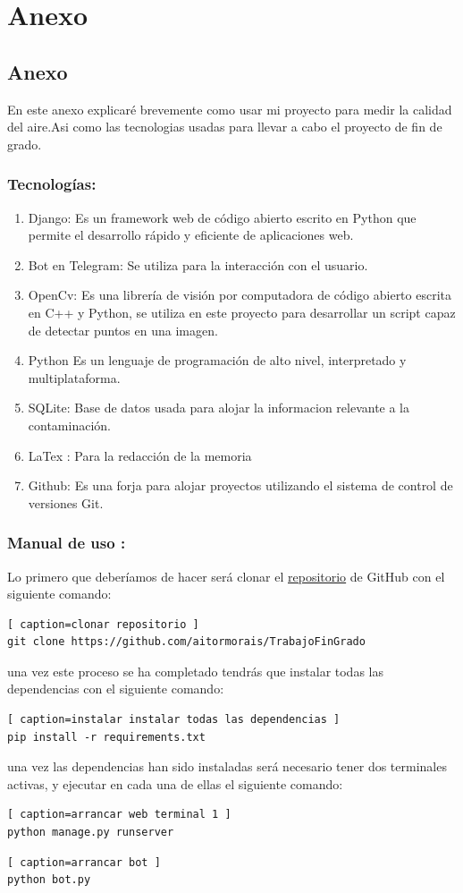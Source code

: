 \chapter{Anexo}\label{int}
\thispagestyle{fancy}


\section*{Anexo}
En este anexo explicaré brevemente como usar mi proyecto para medir la calidad del aire.Asi como las tecnologias usadas para llevar a cabo el proyecto de fin de grado.
\subsection{Tecnologías:}
\begin{enumerate}
    \item Django: Es un framework web de código abierto escrito en Python que permite el desarrollo rápido y eficiente de aplicaciones web.
    \item Bot en Telegram: Se utiliza para la interacción con el usuario.
    \item OpenCv: Es una librería de visión por computadora de código abierto escrita en C++ y Python, se utiliza en este proyecto para desarrollar un script capaz de detectar puntos en una imagen.
    \item Python Es un lenguaje de programación de alto nivel, interpretado y multiplataforma.
    \item SQLite: Base de datos usada para alojar la informacion relevante a la contaminación.
    \item LaTex : Para la redacción de la memoria
    \item Github: Es una forja para alojar proyectos utilizando el sistema de control de versiones Git.
\end{enumerate}
\subsection{Manual de uso :}
Lo primero que deberíamos de hacer será clonar el \hyperlink{https://github.com/aitormorais/TrabajoFinGrado}{repositorio} de GitHub con el siguiente comando:
\begin{lstlisting}[ caption=clonar repositorio ]
git clone https://github.com/aitormorais/TrabajoFinGrado
\end{lstlisting}
una vez este proceso se ha completado tendrás que instalar todas las dependencias con el siguiente comando:
 \begin{lstlisting}[ caption=instalar instalar todas las dependencias ]
pip install -r requirements.txt
\end{lstlisting} una vez las dependencias han sido instaladas será necesario tener dos terminales activas, y ejecutar en cada una de ellas el siguiente comando:
\begin{lstlisting}[ caption=arrancar web terminal 1 ]
python manage.py runserver
\end{lstlisting}
\begin{lstlisting}[ caption=arrancar bot ]
python bot.py
\end{lstlisting}

